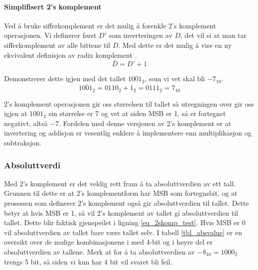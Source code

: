 \documentclass[11pt, a4paper, norwegian]{article}
\begin{document}
\paragraph{Simplifisert 2's komplement}
Ved å bruke sifferkomplement er det mulig å forenkle 2's komplement operasjonen. Vi definerer først $D'$ som inverteringen av $D$, det vil si at man tar sifferkomplement av alle bittene til $D$. Med dette er det mulig å vise en ny ekvivalent definisjon av radix komplement \cite{digtekbok}.
\begin{equation}
\bar{D} = D' + 1
\end{equation}

Demonstrerer dette igjen med det tallet $1001_2$, som vi vet skal bli $-7_{10}$. 
\begin{equation} \label{eq_2skomp_test}
\overline{1001_2} = 0110_2 + 1_2 = 0111_2 = 7_{10}
\end{equation}

2's komplement operasjonen gir oss størrelsen til tallet så utregningen over gir oss igjen at $1001_2$ sin størrelse er 7 og vet at siden MSB er 1, så er fortegnet negativt, altså $-7$.
Fordelen med denne versjonen av 2's komplement er at  invertering og addisjon er vesentlig enklere å implementere enn multiplikasjon og subtraksjon. 


\subsubsection{Absoluttverdi}
Med 2's komplement er det veldig rett fram å ta absoluttverdien av ett tall. Grunnen til dette er at 2's komplementform har MSB som fortegnsbit, og at prosessen som definerer 2's komplement også gir absoluttverdien til tallet. 
Dette betyr at hvis MSB er 1, så vil 2's komplement av tallet gi absoluttverdien til tallet. Dette blir faktisk gjenspeilet i ligning \ref{eq_2skomp_test}. Hvis MSB er 0 vil absoluttverdien av tallet bare være tallet selv. I tabell \ref{tbl_absvalue} er en oversikt over de mulige kombinasjonene i med 4-bit og i høyre del er absoluttverdien av tallene. Merk at for å ta absoluttverdien av $-8_{10}=1000_2$ trengs 5 bit, så siden vi kun har 4 bit vil svaret bli feil. 
\end{document}
